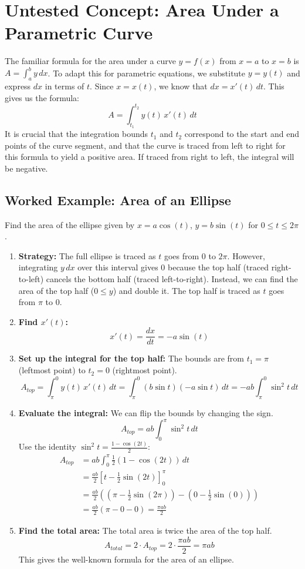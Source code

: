 \documentclass{article}
\begin{document}
\section{Untested Concept: Area Under a Parametric Curve}
The familiar formula for the area under a curve $y=f(x)$ from $x=a$ to $x=b$ is $A = \int_a^b y \, dx$. To adapt this for parametric equations, we substitute $y=y(t)$ and express $dx$ in terms of $t$. Since $x=x(t)$, we know that $dx = x'(t) \, dt$. This gives us the formula:
\[ A = \int_{t_1}^{t_2} y(t) \, x'(t) \, dt \]
It is crucial that the integration bounds $t_1$ and $t_2$ correspond to the start and end points of the curve segment, and that the curve is traced from left to right for this formula to yield a positive area. If traced from right to left, the integral will be negative.

\subsection*{Worked Example: Area of an Ellipse}
Find the area of the ellipse given by $x = a\cos(t)$, $y = b\sin(t)$ for $0 \le t \le 2\pi$.

\begin{enumerate}
    \item \textbf{Strategy:} The full ellipse is traced as $t$ goes from $0$ to $2\pi$. However, integrating $y \, dx$ over this interval gives 0 because the top half (traced right-to-left) cancels the bottom half (traced left-to-right). Instead, we can find the area of the top half ($0 \le y$) and double it. The top half is traced as $t$ goes from $\pi$ to $0$.
    \item \textbf{Find $x'(t)$:}
    \[ x'(t) = \frac{dx}{dt} = -a\sin(t) \]
    \item \textbf{Set up the integral for the top half:} The bounds are from $t_1=\pi$ (leftmost point) to $t_2=0$ (rightmost point).
    \[ A_{top} = \int_{\pi}^{0} y(t) \, x'(t) \, dt = \int_{\pi}^{0} (b\sin t)(-a\sin t) \, dt = -ab \int_{\pi}^{0} \sin^2 t \, dt \]
    \item \textbf{Evaluate the integral:} We can flip the bounds by changing the sign.
    \[ A_{top} = ab \int_{0}^{\pi} \sin^2 t \, dt \]
    Use the identity $\sin^2 t = \frac{1 - \cos(2t)}{2}$:
    \begin{align*}
    A_{top} &= ab \int_{0}^{\pi} \frac{1}{2}(1 - \cos(2t)) \, dt \\
    &= \frac{ab}{2} \left[ t - \frac{1}{2}\sin(2t) \right]_{0}^{\pi} \\
    &= \frac{ab}{2} \left( (\pi - \frac{1}{2}\sin(2\pi)) - (0 - \frac{1}{2}\sin(0)) \right) \\
    &= \frac{ab}{2} (\pi - 0 - 0) = \frac{\pi ab}{2}
    \end{align*}
    \item \textbf{Find the total area:} The total area is twice the area of the top half.
    \[ A_{total} = 2 \cdot A_{top} = 2 \cdot \frac{\pi ab}{2} = \pi ab \]
    This gives the well-known formula for the area of an ellipse.
\end{enumerate}
\end{document}
